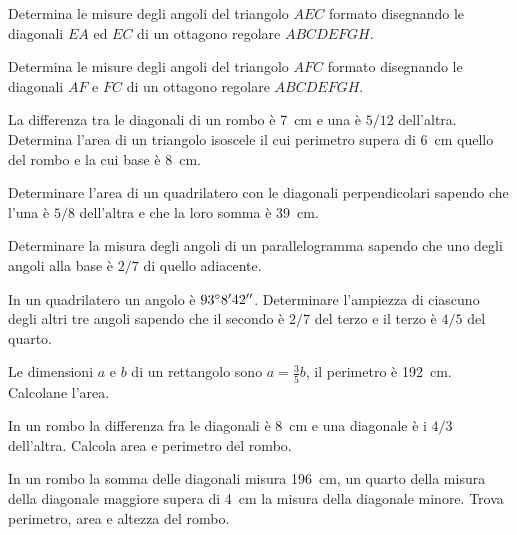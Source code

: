 \begin{multicols}{2}
\begin{esercizio}
\label{ese:7.56}
Determina le misure degli angoli del triangolo $AEC$ formato disegnando le diagonali $EA$ ed $EC$ di un ottagono regolare $ABCDEFGH$.
\end{esercizio}

\begin{esercizio}
\label{ese:7.57}
Determina le misure degli angoli del triangolo $AFC$ formato disegnando le diagonali $AF$ e $FC$ di un ottagono regolare $ABCDEFGH$.
\end{esercizio}

\begin{esercizio}
\label{ese:7.58}
La differenza tra le diagonali di un rombo è 7~cm e una è $5/12$ dell'altra. Determina l'area di un triangolo isoscele il cui perimetro supera di 6~cm quello del rombo e la cui base è 8~cm.
\end{esercizio}

\begin{esercizio}
\label{ese:7.59}
Determinare l'area di un quadrilatero con le diagonali perpendicolari sapendo che l'una è $5/8$ dell'altra e che la loro somma è 39~cm.
\end{esercizio}

\begin{esercizio}
\label{ese:7.60}
Determinare la misura degli angoli di un parallelogramma sapendo che uno degli angoli alla base è $2/7$ di quello adiacente.
\end{esercizio}

\begin{esercizio}
\label{ese:7.61}
In un quadrilatero un angolo è $93{}^{\circ}8'42''$. Determinare l'ampiezza di ciascuno degli altri tre angoli sapendo che il secondo è $2/7$ del terzo e il terzo è $4/5$ del quarto.
\end{esercizio}

\begin{esercizio}
\label{ese:7.62}
Le dimensioni $a$ e $b$ di un rettangolo sono $a=\frac{3}{5}b$, il perimetro è 192~cm. Calcolane l'area.
\end{esercizio}

\begin{esercizio}
\label{ese:7.63}
In un rombo la differenza fra le diagonali è 8~cm e una diagonale è i $4/3$ dell'altra. Calcola area e perimetro del rombo.
\end{esercizio}

\begin{esercizio}
\label{ese:7.64}
In un rombo la somma delle diagonali misura 196~cm, un quarto della misura della diagonale maggiore supera di 4~cm la misura della diagonale minore. Trova perimetro, area e altezza del rombo.
\end{esercizio}


\end{multicols}
